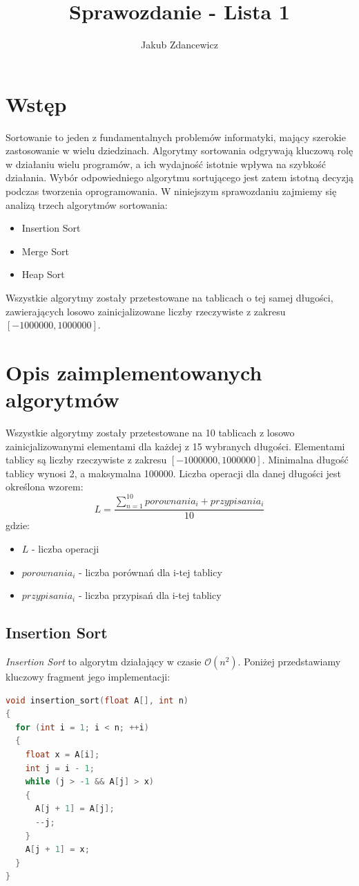 \documentclass{article}
\title{Sprawozdanie - Lista 1}
\author{Jakub Zdancewicz}
\date{}
\newcommand{\bigO}{\mathcal{O}}
\begin{document}
\maketitle

\tableofcontents
\newpage

\section{Wstęp}
Sortowanie to jeden z fundamentalnych problemów informatyki, mający szerokie zastosowanie w wielu dziedzinach. Algorytmy sortowania odgrywają kluczową rolę w działaniu wielu programów, a ich wydajność istotnie wpływa na szybkość działania. Wybór odpowiedniego algorytmu sortującego jest zatem istotną decyzją podczas tworzenia oprogramowania. W niniejszym sprawozdaniu zajmiemy się analizą trzech algorytmów sortowania:
\begin{itemize}
    \item Insertion Sort
    \item Merge Sort
    \item Heap Sort
\end{itemize}
Wszystkie algorytmy zostały przetestowane na tablicach o tej samej długości, zawierających losowo zainicjalizowane liczby rzeczywiste z zakresu $[-1000000, 1000000]$.

\section{Opis zaimplementowanych algorytmów}
Wszystkie algorytmy zostały przetestowane na 10 tablicach z losowo zainicjalizowanymi elementami dla każdej z 15 wybranych długości. Elementami tablicy są liczby rzeczywiste z zakresu $[-1000000, 1000000]$. Minimalna długość tablicy wynosi 2, a maksymalna 100000. Liczba operacji dla danej długości jest określona wzorem:
\[
    L = \frac{\sum_{n=1}^{10} porownania_i + przypisania_i}{10}
\]
gdzie:
\begin{itemize}
    \item[] $L$ - liczba operacji
    \item[] $porownania_i$ - liczba porównań dla i-tej tablicy
    \item[] $przypisania_i$ - liczba przypisań dla i-tej tablicy
\end{itemize}
\subsection{Insertion Sort}
\textit{Insertion Sort} to algorytm działający w czasie $\bigO(n^2)$. Poniżej przedstawiamy kluczowy fragment jego implementacji:
\newpage
\begin{lstlisting}[style=mystyle, language=C++, caption={Implementacja Insertion Sort}, label={lst:insertion}]
void insertion_sort(float A[], int n)
{
  for (int i = 1; i < n; ++i)
  {
    float x = A[i];
    int j = i - 1;
    while (j > -1 && A[j] > x)
    {
      A[j + 1] = A[j];
      --j;
    }
    A[j + 1] = x;
  }
}
\end{lstlisting}
\end{document}

